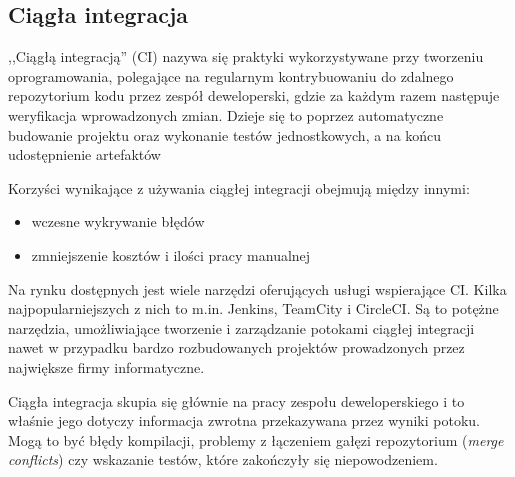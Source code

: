 \documentclass[twoside,a4paper]{report}
\begin{document}
\subsection{Ciągła integracja}
,,Ciągłą integracją'' (CI) nazywa się praktyki wykorzystywane przy tworzeniu oprogramowania, polegające na regularnym kontrybuowaniu do zdalnego repozytorium kodu przez zespół deweloperski, gdzie za każdym razem następuje weryfikacja wprowadzonych zmian.
Dzieje się to poprzez automatyczne budowanie projektu oraz wykonanie testów jednostkowych, a na końcu udostępnienie artefaktów

Korzyści wynikające z używania ciągłej integracji obejmują między innymi:
\begin{itemize}[noitemsep,topsep=0pt]
    \item wczesne wykrywanie błędów
    \item zmniejszenie kosztów i ilości pracy manualnej
\end{itemize}

Na rynku dostępnych jest wiele narzędzi oferujących usługi wspierające CI\@. Kilka najpopularniejszych z nich to m.in. Jenkins, TeamCity i CircleCI\@.
Są to potężne narzędzia, umożliwiające tworzenie i zarządzanie potokami ciągłej integracji nawet w przypadku bardzo rozbudowanych projektów prowadzonych przez największe firmy informatyczne.

Ciągła integracja skupia się głównie na pracy zespołu deweloperskiego i to właśnie jego dotyczy informacja zwrotna przekazywana przez wyniki potoku.
Mogą to być błędy kompilacji, problemy z łączeniem gałęzi repozytorium (\textit{merge conflicts}) czy wskazanie testów, które zakończyły się niepowodzeniem.
\end{document}
